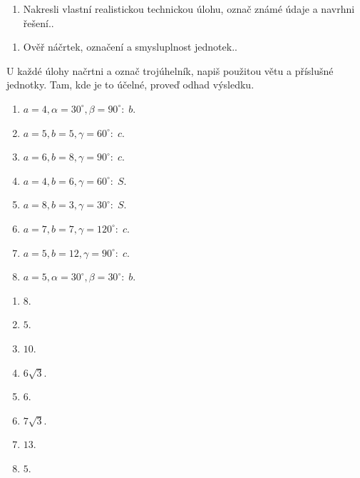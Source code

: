 \documentclass[11pt,a4paper]{article}
\begin{document}
\begin{zadaniReseniBox}[title={Rozšíření 1}]
\begin{enumerate}[label=\alph*)]
\item Nakresli vlastní realistickou technickou úlohu, označ známé údaje a navrhni řešení..
\end{enumerate}
\tcblower
\begin{enumerate}[label=\alph*)]
\item Ověř náčrtek, označení a smysluplnost jednotek..
\end{enumerate}
\end{zadaniReseniBox}
U každé úlohy načrtni a označ trojúhelník, napiš použitou větu a příslušné jednotky. Tam, kde je to účelné, proveď odhad výsledku.
\begin{zadaniReseniBox}[title={Domácí úkol}]
\begin{enumerate}[label=\alph*)]
\item $a=4,\alpha=30^\circ,\beta=90^\circ:\;b$.
\item $a=5,b=5,\gamma=60^\circ:\;c$.
\item $a=6,b=8,\gamma=90^\circ:\;c$.
\item $a=4,b=6,\gamma=60^\circ:\;S$.
\item $a=8,b=3,\gamma=30^\circ:\;S$.
\item $a=7,b=7,\gamma=120^\circ:\;c$.
\item $a=5,b=12,\gamma=90^\circ:\;c$.
\item $a=5,\alpha=30^\circ,\beta=30^\circ:\;b$.
\end{enumerate}
\tcblower
\begin{enumerate}[label=\alph*)]
\item $8$.
\item $5$.
\item $10$.
\item $6\sqrt3$.
\item $6$.
\item $7\sqrt3$.
\item $13$.
\item $5$.
\end{enumerate}
\end{zadaniReseniBox}
\end{document}
